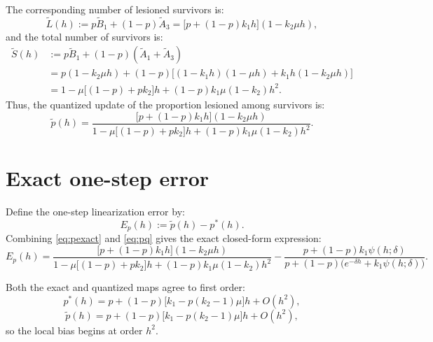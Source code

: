 \documentclass{article}
\begin{document}
The corresponding number of lesioned survivors is:
\[
\widetilde L(h)
:= p\widetilde B_1 + (1-p)\widetilde A_3
= \bigl[p+(1-p)k_1 h\bigr](1-k_2\mu h),
\]
and the total number of survivors is:
\begin{align*}
\widetilde S(h)
&:= p\widetilde B_1 + (1-p)(\widetilde A_1+\widetilde A_3) \\
&= p(1-k_2\mu h)
 + (1-p)\bigl[(1-k_1 h)(1-\mu h)+k_1 h(1-k_2\mu h)\bigr] \\
&= 1-\mu\bigl[(1-p)+pk_2\bigr]h
   +(1-p)k_1\mu(1-k_2)h^2.
\end{align*}
Thus, the quantized update of the proportion lesioned among survivors is:
\begin{equation}
\label{eq:pq}
\widetilde p(h)
=
\frac{\bigl[p+(1-p)k_1 h\bigr](1-k_2\mu h)}
{1-\mu\bigl[(1-p)+pk_2\bigr]h +(1-p)k_1\mu(1-k_2)h^2}.
\end{equation}

\section*{Exact one-step error}

Define the one-step linearization error by:
\[
E_p(h):=\widetilde p(h)-p^\ast(h).
\]
Combining \eqref{eq:pexact} and \eqref{eq:pq} gives the exact closed-form expression:
\begin{equation}
\label{eq:exact_error}
E_p(h)
=
\frac{\bigl[p+(1-p)k_1 h\bigr](1-k_2\mu h)}
{1-\mu\bigl[(1-p)+pk_2\bigr]h +(1-p)k_1\mu(1-k_2)h^2}
-
\frac{p+(1-p)k_1\psi(h;\delta)}
{p+(1-p)\bigl(e^{-\delta h}+k_1\psi(h;\delta)\bigr)}.
\end{equation}

Both the exact and quantized maps agree to first order:
\[
p^\ast(h)
=
p+(1-p)\bigl[k_1-p(k_2-1)\mu\bigr]h+O(h^2),
\]
\[
\widetilde p(h)
=
p+(1-p)\bigl[k_1-p(k_2-1)\mu\bigr]h+O(h^2),
\]
so the local bias begins at order \(h^2\).
\end{document}
